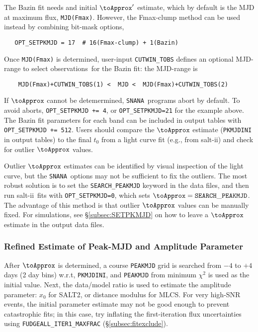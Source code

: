 \documentclass[12pt]{article}
\newcommand{\SALTII}{{\sc salt-ii}}
\newcommand{\SNANA}{{\tt SNANA}}
\newcommand{\obss}{observations}
\begin{document}
The Bazin fit needs and initial $\toApprox'$ estimate, which by default
is the  MJD at maximum flux, {\tt MJD(Fmax)}. 
However, the Fmax-clump method can be used instead by combining 
bit-mask options,
\begin{verbatim}
   OPT_SETPKMJD = 17  # 16(Fmax-clump) + 1(Bazin)
\end{verbatim}
%
Once {\tt MJD(Fmax)} is determined, user-input {\tt CUTWIN\_TOBS} defines an 
optional MJD-range to select \obss\ for the Bazin fit: 
the MJD-range is 
\begin{verbatim}
    MJD(Fmax)+CUTWIN_TOBS(1) <  MJD <  MJD(Fmax)+CUTWIN_TOBS(2)
\end{verbatim}
%
If $\toApprox$ cannot be detemermined, \SNANA\ programs abort by default.
To avoid aborts, {\tt OPT\_SETPKMJD += 4}, or {\tt OPT\_SETPKMJD=21}
for the example above.
The Bazin fit parameters for each band can be included in output
tables with {\tt OPT\_SETPKMJD += 512}.
Users should compare the $\toApprox$ estimate ({\tt PKMJDINI} in output tables) 
to the final $t_0$ from a light curve fit (e.g., from \SALTII)
and check for outlier $\toApprox$ values. 

Outlier $\toApprox$ estimates can be identified by visual 
inspection of the light curve, but the \SNANA\  options may
not be sufficient to fix the outliers. The most robust solution is
to set the {\tt SEARCH\_PEAKMJD} keyword in the data files,
and then run \SALTII\ fits with {\tt OPT\_SETPKMJD=0}, which
sets $\toApprox = {\tt SEARCH\_PEAKMJD}$. The advantage of this
method is that outlier $\toApprox$ values can be manually fixed.
For simulations, see \S\ref{subsec:SETPKMJD} on how to leave
a $\toApprox$ estimate in the output data files.



\subsubsection{Refined Estimate of Peak-MJD and Amplitude Parameter}
\label{sss:initial_fitpar}

After $\toApprox$ is determined, a course {\tt PEAKMJD} grid
is searched from $-4$ to $+4$ days (2 day bins) w.r.t, {\tt PKMJDINI},
and {\tt PEAKMJD} from minimum $\chi^2$ is used as the initial value.
Next, the data/model ratio is used to estimate the amplitude parameter:
$x_0$ for SALT2, or distance modulus for MLCS.
For very high-SNR events, the initial parameter estimate may not
be good enough to prevent catastrophic fits; in this case,
try inflating the first-iteration flux uncertainties
using {\tt FUDGEALL\_ITER1\_MAXFRAC}  (\S\ref{subsec:fitexclude}).
\end{document}
